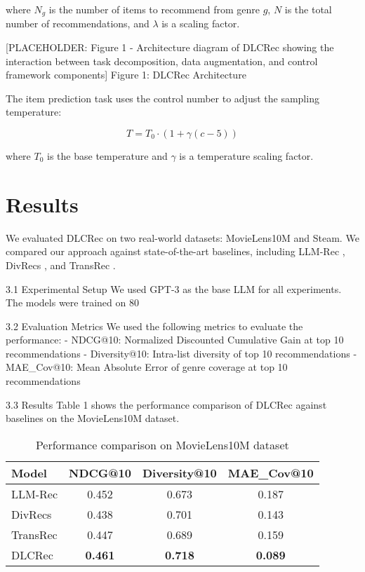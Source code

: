 \documentclass[12pt,letterpaper]{article}
\begin{document}
where $N_g$ is the number of items to recommend from genre $g$, $N$ is the total number of recommendations, and $\lambda$ is a scaling factor.

[PLACEHOLDER: Figure 1 - Architecture diagram of DLCRec showing the interaction between task decomposition, data augmentation, and control framework components]
Figure 1: DLCRec Architecture

The item prediction task uses the control number to adjust the sampling temperature:

\begin{equation}
T = T_0 \cdot (1 + \gamma(c - 5))
\end{equation}

where $T_0$ is the base temperature and $\gamma$ is a temperature scaling factor.

\section{Results}

We evaluated DLCRec on two real-world datasets: MovieLens10M and Steam. We compared our approach against state-of-the-art baselines, including LLM-Rec \cite{llmrec}, DivRecs \cite{divrecs}, and TransRec \cite{transrec}.

3.1 Experimental Setup
We used GPT-3 as the base LLM for all experiments. The models were trained on 80%

3.2 Evaluation Metrics
We used the following metrics to evaluate the performance:
- NDCG@10: Normalized Discounted Cumulative Gain at top 10 recommendations
- Diversity@10: Intra-list diversity of top 10 recommendations
- MAE_Cov@10: Mean Absolute Error of genre coverage at top 10 recommendations

3.3 Results
Table 1 shows the performance comparison of DLCRec against baselines on the MovieLens10M dataset.

\begin{table}[h]
\centering
\begin{tabular}{lccc}
\hline
Model & NDCG@10 & Diversity@10 & MAE_Cov@10 \\
\hline
LLM-Rec & 0.452 & 0.673 & 0.187 \\
DivRecs & 0.438 & 0.701 & 0.143 \\
TransRec & 0.447 & 0.689 & 0.159 \\
DLCRec & \textbf{0.461} & \textbf{0.718} & \textbf{0.089} \\
\hline
\end{tabular}
\caption{Performance comparison on MovieLens10M dataset}
\end{table}
\end{document}
